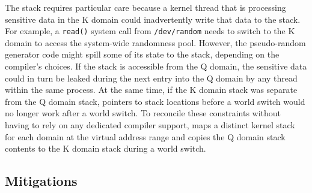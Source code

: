 The stack requires particular care because a kernel thread that is
processing sensitive data in the K domain could inadvertently write
that data to the stack.  For example, a \texttt{read()} system call
from \texttt{/dev/random} needs to switch to the K domain to access the
system-wide randomness pool.  However, the pseudo-random generator code
might spill some of its state to the stack, depending on the compiler's
choices.  If the stack is accessible from the Q domain, the sensitive
data could in turn be leaked during the next entry into the Q domain by any
thread within the same process.  At the same time, if the
K domain stack was separate from the Q domain stack, pointers to stack
locations before a world switch would no longer work after a world switch.
To reconcile these constraints without having to rely on any dedicated
compiler support, \sys maps a distinct kernel stack for each domain at the
virtual address range and copies the Q domain stack contents to the K domain
stack during a world switch.


\subsection*{Mitigations}
\label{ss:mitigations}


